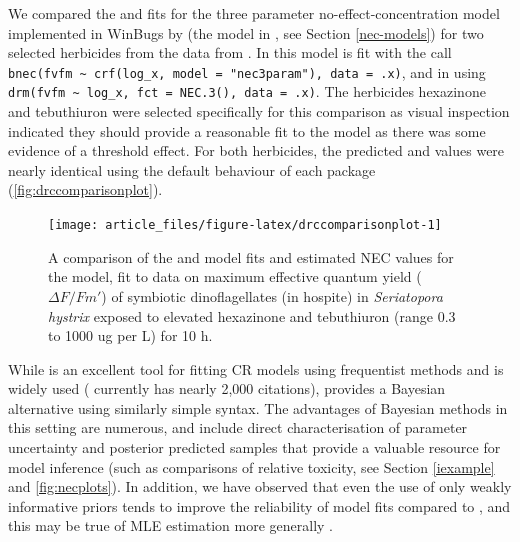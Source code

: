 \documentclass[
  shortnames]{jss}
\begin{document}
We compared the  and  fits for the three parameter no-effect-concentration model implemented in WinBugs by \citet{Fox2010} (the  model in , see Section \ref{nec-models}) for two selected herbicides from the data from \citet{jones2003meps}. In  this model is fit with the call \texttt{bnec(fvfm\ \textasciitilde{}\ crf(log\_x,\ model\ =\ "nec3param"),\ data\ =\ .x)}, and in  using \texttt{drm(fvfm\ \textasciitilde{}\ log\_x,\ fct\ =\ NEC.3(),\ data\ =\ .x)}. The herbicides hexazinone and tebuthiuron were selected specifically for this comparison as visual inspection indicated they should provide a reasonable fit to the \citet{Fox2010} model as there was some evidence of a threshold effect. For both herbicides, the predicted  and  values were nearly identical using the default behaviour of each package (\autoref{fig:drccomparisonplot}).

\begin{CodeChunk}
\begin{figure}[!ht]

{\centering \texttt{[image: article\_files/figure-latex/drccomparisonplot-1]} 

}

\caption[A comparison of the  and  model fits and estimated NEC values for the  model, fit to data on maximum effective quantum yield ($\Delta F / Fm'$) of symbiotic dinoflagellates (in hospite) in \textit{Seriatopora hystrix} exposed to elevated hexazinone and tebuthiuron (range 0.3 to 1000 ug per L) for 10 h]{A comparison of the  and  model fits and estimated NEC values for the  model, fit to data on maximum effective quantum yield ($\Delta F / Fm'$) of symbiotic dinoflagellates (in hospite) in \textit{Seriatopora hystrix} exposed to elevated hexazinone and tebuthiuron (range 0.3 to 1000 ug per L) for 10 h.}\label{fig:drccomparisonplot}
\end{figure}
\end{CodeChunk}

While  is an excellent tool for fitting CR models using frequentist methods and is widely used (\citet{Ritz2016} currently has nearly 2,000 citations),  provides a Bayesian alternative using similarly simple syntax. The advantages of Bayesian methods in this setting are numerous, and include direct characterisation of parameter uncertainty and posterior predicted samples that provide a valuable resource for model inference (such as comparisons of relative toxicity, see Section \ref{iexample} and \autoref{fig:necplots}). In addition, we have observed that even the use of only weakly informative priors tends to improve the reliability of model fits compared to , and this may be true of MLE estimation more generally \citep{krull2020comparing}.
\end{document}
